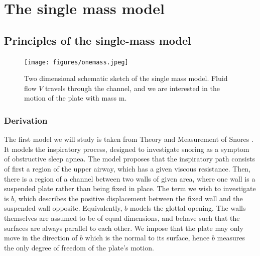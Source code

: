 



%

\chapter{The single mass model}
\label{cha:onemass}

\section{Principles of the single-mass model}

\begin{figure}[h!]
	\centering
	\texttt{[image: figures/onemass.jpeg]}
	\caption{
		Two dimensional schematic sketch of the single mass model.
		Fluid flow $V$ travels through the channel,
		and we are interested in the motion of the plate with mass $\mathrm{m}$.
	}
\end{figure}

\subsection{Derivation}

The first model we will study is taken from Theory and Measurement of Snores \citep{gavriely_jensen_1993}.
It models the inspiratory process, designed to investigate snoring as a symptom of obstructive sleep apnea.
The model proposes that the inspiratory path consists of first a region of the upper airway,
which has a given viscous resistance.
Then, there is a region of a channel between two walls of given area, where one wall is a suspended plate rather than being fixed in place.
The term we wish to investigate is $b$, which describes the positive displacement between the fixed wall and the suspended wall opposite.
Equivalently, $b$ models the glottal opening.
The walls themselves are assumed to be of equal dimensions, and behave such that the surfaces are always parallel to each other.
We impose that the plate may only move in the direction of $b$ which is the normal to its surface,
hence $b$ measures the only degree of freedom of the plate's motion.

